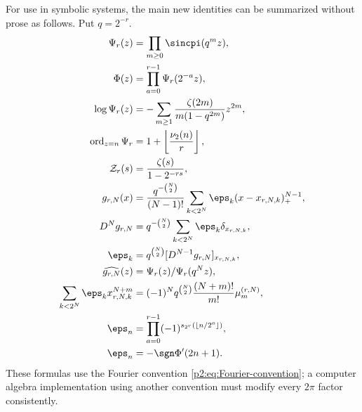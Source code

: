 \documentclass[11pt,oneside]{article}
\theoremstyle{definition}
\newcommand{\ord}{\operatorname{ord}}
\begin{document}
For use in symbolic systems, the main new identities can be summarized without
prose as follows.  Put $q=2^{-r}$.
\begin{align}
 \Psi_r(z)&=\prod_{m\ge0}\sincpi(q^mz),                    \label{p2:eq:machine-1}\\
 \Phi(z)&=\prod_{a=0}^{r-1}\Psi_r(2^{-a}z),                \label{p2:eq:machine-2}\\
 \log\Psi_r(z)&=-\sum_{m\ge1}\frac{\zeta(2m)}{m(1-q^{2m})}z^{2m}, \label{p2:eq:machine-3}\\
 \ord_{z=n}\Psi_r&=1+\left\lfloor\frac{\nu_2(n)}r\right\rfloor, \label{p2:eq:machine-4}\\
 \mathcal Z_r(s)&=\frac{\zeta(s)}{1-2^{-rs}},             \label{p2:eq:machine-5}\\
 g_{r,N}(x)&=\frac{q^{-\binom N2}}{(N-1)!}
 \sum_{k<2^N}\eps_k(x-x_{r,N,k})_+^{N-1},                \label{p2:eq:machine-6}\\
 D^Ng_{r,N}&=q^{-\binom N2}\sum_{k<2^N}\eps_k\delta_{x_{r,N,k}}, \label{p2:eq:machine-7}\\
 \eps_k&=q^{\binom N2}[D^{N-1}g_{r,N}]_{x_{r,N,k}},       \label{p2:eq:machine-8}\\
 \widehat{g_{r,N}}(z)&=\Psi_r(z)/\Psi_r(q^Nz),            \label{p2:eq:machine-9}\\
 \sum_{k<2^N}\eps_kx_{r,N,k}^{N+m}
 &=(-1)^Nq^{\binom N2}\frac{(N+m)!}{m!}\mu_m^{(r,N)},    \label{p2:eq:machine-10}\\
 \eps_n&=\prod_{a=0}^{r-1}(-1)^{s_{2^r}(\lfloor n/2^a\rfloor)}, \label{p2:eq:machine-11}\\
 \eps_n&=-\sgn\Phi'(2n+1).                               \label{p2:eq:machine-12}
\end{align}
These formulas use the Fourier convention \eqref{p2:eq:Fourier-convention}; a
computer algebra implementation using another convention must modify every
$2\pi$ factor consistently.
\end{document}
